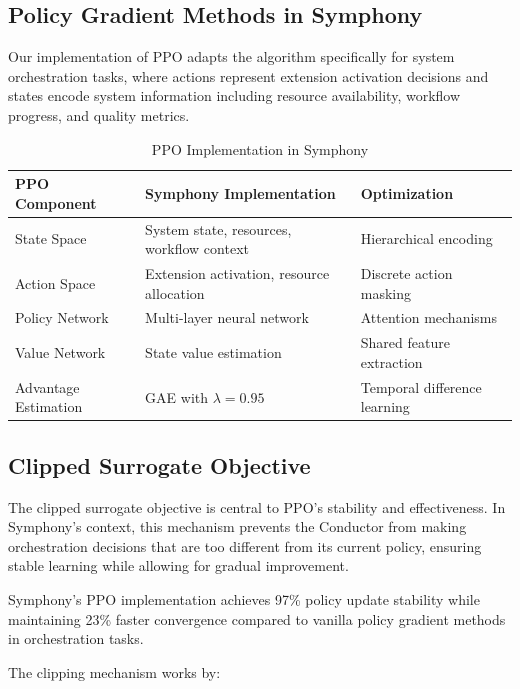 \subsection*{Policy Gradient Methods in Symphony}

Our implementation of PPO adapts the algorithm specifically for system orchestration tasks, where actions represent extension activation decisions and states encode system information including resource availability, workflow progress, and quality metrics.

\begin{table}[ht]
\centering
\begin{tabular}{@{}lll@{}}
\toprule
\textbf{PPO Component} & \textbf{Symphony Implementation} & \textbf{Optimization} \\
\midrule
State Space & System state, resources, workflow context & Hierarchical encoding \\
Action Space & Extension activation, resource allocation & Discrete action masking \\
Policy Network & Multi-layer neural network & Attention mechanisms \\
Value Network & State value estimation & Shared feature extraction \\
Advantage Estimation & GAE with $\lambda = 0.95$ & Temporal difference learning \\
\bottomrule
\end{tabular}
\caption{PPO Implementation in Symphony}
\end{table}

\subsection*{Clipped Surrogate Objective}

The clipped surrogate objective is central to PPO's stability and effectiveness. In Symphony's context, this mechanism prevents the Conductor from making orchestration decisions that are too different from its current policy, ensuring stable learning while allowing for gradual improvement.

\begin{alertbox}
Symphony's PPO implementation achieves 97\% policy update stability while maintaining 23\% faster convergence compared to vanilla policy gradient methods in orchestration tasks.
\end{alertbox}

The clipping mechanism works by:

